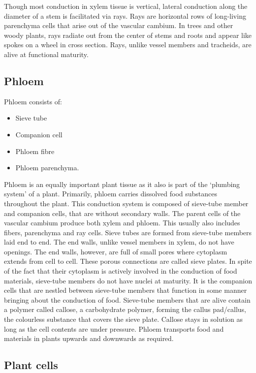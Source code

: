 Though most conduction in xylem tissue is vertical, lateral conduction along the diameter of a stem is facilitated via rays. Rays are horizontal rows of long-living parenchyma cells that arise out of the vascular cambium. In trees and other woody plants, rays radiate out from the center of stems and roots and appear like spokes on a wheel in cross section. Rays, unlike vessel members and tracheids, are alive at functional maturity.

\hypertarget{phloem}{%
\subsection{Phloem}\label{phloem}}

Phloem consists of:

\begin{itemize}
\tightlist
\item
  Sieve tube
\item
  Companion cell
\item
  Phloem fibre
\item
  Phloem parenchyma.
\end{itemize}

Phloem is an equally important plant tissue as it also is part of the `plumbing system' of a plant. Primarily, phloem carries dissolved food substances throughout the plant. This conduction system is composed of sieve-tube member and companion cells, that are without secondary walls. The parent cells of the vascular cambium produce both xylem and phloem. This usually also includes fibers, parenchyma and ray cells. Sieve tubes are formed from sieve-tube members laid end to end. The end walls, unlike vessel members in xylem, do not have openings. The end walls, however, are full of small pores where cytoplasm extends from cell to cell. These porous connections are called sieve plates. In spite of the fact that their cytoplasm is actively involved in the conduction of food materials, sieve-tube members do not have nuclei at maturity. It is the companion cells that are nestled between sieve-tube members that function in some manner bringing about the conduction of food. Sieve-tube members that are alive contain a polymer called callose, a carbohydrate polymer, forming the callus pad/callus, the colourless substance that covers the sieve plate. Callose stays in solution as long as the cell contents are under pressure. Phloem transports food and materials in plants upwards and downwards as required.

\hypertarget{plant-cells}{%
\subsection{Plant cells}\label{plant-cells}}

